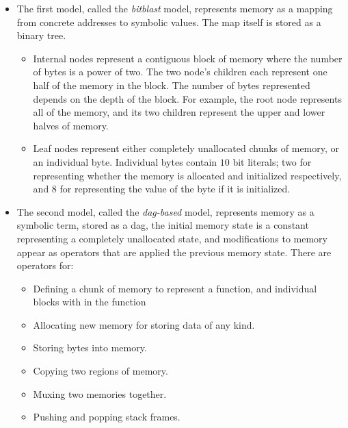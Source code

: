 \documentclass{article}
\begin{document}
\begin{itemize}

  \item The first model, called the \emph{bitblast} model, represents memory
           as a mapping from concrete addresses to symbolic values.  The map
           itself is stored as a binary tree.
           
   \begin{itemize}

     \item Internal nodes represent a contiguous block of memory where the
             number of bytes is a power of two.  The two node's children each
             represent one half of the memory in the block.  The number of bytes
             represented depends on the depth of the block.  For example, the
             root node represents all of the memory, and its two children
             represent the upper and lower halves of memory.

     \item Leaf nodes represent either completely unallocated chunks of memory,
             or an individual byte.  Individual bytes contain $10$ bit literals;
             two for representing whether the memory is allocated and initialized
             respectively, and $8$ for representing the value of the byte if it
             is initialized.

   \end{itemize}


  \item The second model, called the \emph{dag-based} model, represents memory
          as a symbolic term, stored as a dag, the initial memory state is a
          constant representing a completely unallocated state, and
          modifications to memory appear as operators that are applied the previous
          memory state.  There are operators for:
          \begin{itemize}

            \item Defining a chunk of memory to represent a function, and individual blocks with in the function
            \item Allocating new memory for storing data of any kind.
            \item Storing bytes into memory.
            \item Copying two regions of memory.
            \item Muxing two memories together.
            \item Pushing and popping stack frames.


\end{itemize}
\end{itemize}
\end{document}
